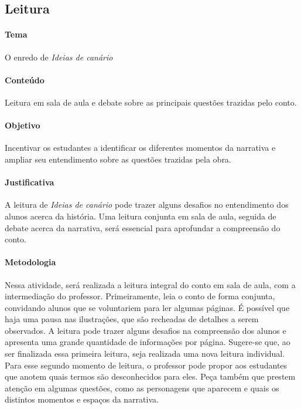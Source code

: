 \documentclass[11pt]{extarticle}
\begin{document}
\subsection{Leitura}


\paragraph{Tema} O enredo de \textit{Ideias de canário}

\paragraph{Conteúdo} Leitura em sala de aula e debate sobre as principais questões trazidas pelo conto.

\paragraph{Objetivo} Incentivar os estudantes a identificar os diferentes momentos da narrativa e ampliar seu entendimento sobre as questões trazidas pela obra.

\paragraph{Justificativa} A leitura de \textit{Ideias de canário} pode trazer alguns desafios no entendimento dos alunos acerca da história. Uma leitura conjunta em sala de aula, seguida de debate acerca da narrativa, será essencial para aprofundar a compreensão do conto.

\paragraph{Metodologia} Nessa atividade, será realizada a leitura integral do conto em sala de aula, com a intermediação do professor. Primeiramente, leia o conto de forma conjunta, convidando alunos que se voluntariem para ler algumas páginas. É possível que haja uma pausa nas ilustrações, que são recheadas de detalhes a serem observados. A leitura pode trazer alguns desafios na compreensão dos alunos e apresenta uma grande quantidade de informações por página. Sugere-se que, ao ser finalizada essa primeira leitura, seja realizada uma nova leitura individual. Para esse segundo momento de leitura, o professor pode propor aos estudantes que anotem quais termos são desconhecidos para eles. Peça também que prestem atenção em algumas questões, como as personagens que aparecem e quais os distintos momentos e espaços da narrativa.
\end{document}
